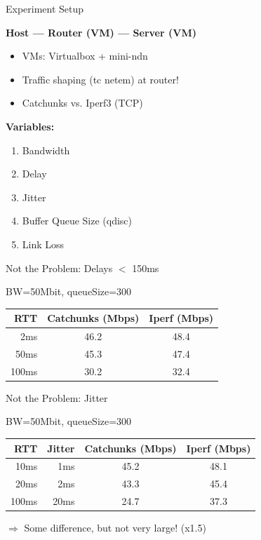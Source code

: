 \begin{frame}{Experiment Setup}

\textbf{Host --- Router (VM) --- Server (VM)}

\pause
\begin{itemize}
\item VMs: Virtualbox + mini-ndn
\item Traffic shaping (tc netem) at router!
\item Catchunks vs. Iperf3 (TCP)
\end{itemize}

\pause

\textbf{Variables:}
\begin{enumerate}
\item Bandwidth
\item Delay
\item Jitter
\item Buffer Queue Size (qdisc)
\item Link Loss
\end{enumerate}

\end{frame}


\begin{frame}[fragile]{Not the Problem: Delays $<$ 150ms}

BW=50Mbit, queueSize=300
\vspace{1em}

\begin{tabular}{rcc}
\toprule
\textbf{RTT} & \textbf{Catchunks (Mbps)} & \textbf{Iperf (Mbps)} \\ 
\midrule
2ms 	& 46.2  & 48.4 \\
50ms	& 45.3  & 47.4 \\
100ms & 30.2	& 32.4 \\
\bottomrule
\end{tabular}

\end{frame}


\begin{frame}[fragile]{Not the Problem: Jitter}

BW=50Mbit, queueSize=300
\vspace{1em}

\begin{tabular}{rrcc}
\toprule
\textbf{RTT} & \textbf{Jitter} &  \textbf{Catchunks (Mbps)} & \textbf{Iperf (Mbps)} \\ 
\midrule
10ms 	& 1ms		& 45.2  & 48.1 \\
20ms 	& 2ms		& 43.3  & 45.4 \\
100ms	& 20ms	& 24.7  & 37.3 \\
\bottomrule
\end{tabular}

\vspace*{1em}

$\Rightarrow$ Some difference, but not very large! (x1.5)

\end{frame}




